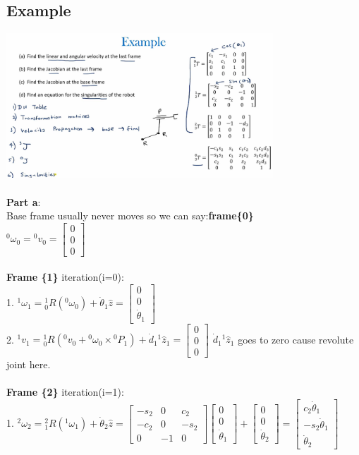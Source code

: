 \documentclass{article}
\begin{document}
\subsection{Example}
\includegraphics[width=10cm]{vel_prop_example.png}\\\\
\textbf{Part a}:\\
Base frame usually never moves so we can say:\textbf{frame\{0\}}\\
${}^0\omega_0={}^0v_0=\begin{bmatrix}
0\\
0\\
0
\end{bmatrix}$\\\\
\textbf{Frame \{1\}} iteration(i=0):\\
1. ${}^1 \omega_1 = {}^1_0R ({}^0 \omega_0) + \dot{\theta}_1 \hat{z} = \begin{bmatrix}
    0\\
    0\\
    \dot{\theta}_1
\end{bmatrix}$\\
2. ${}^{1}v_{1}={}^{1}_0R({}^0 v_0 + {}^0 \omega_0 \times {}^0 P_{1}) + \dot{d}_{1} {}^{1}\hat{z}_{1}=\begin{bmatrix}
    0\\
    0\\
    0
\end{bmatrix}$ $\dot{d}_{1} {}^{1}\hat{z}_{1}$ goes to zero cause revolute joint here.\\\\
\textbf{Frame \{2\}} iteration(i=1):\\
1. ${}^2 \omega_2 = {}^2_1R ({}^1 \omega_1) + \dot{\theta}_2 \hat{z} =\begin{bmatrix}
-s_2 & 0 & c_2\\
-c_2 & 0 & -s_2\\
0 & -1 & 0
\end{bmatrix} \begin{bmatrix}
    0\\
    0\\
    \dot{\theta}_1
\end{bmatrix} + \begin{bmatrix}
0\\
0\\
\dot{\theta}_2
\end{bmatrix} = \begin{bmatrix}
    c_2\dot{\theta}_1\\
    -s_2\dot{\theta}_1\\
    \dot{\theta}_2
\end{bmatrix}$\\
\end{document}
